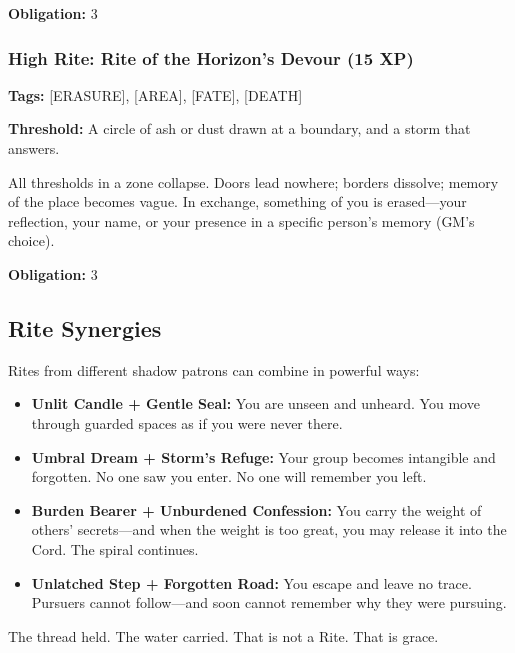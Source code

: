 \textbf{Obligation:} 3

\subsubsection{High Rite: Rite of the Horizon's Devour (15 XP)}

\textbf{Tags:} [ERASURE], [AREA], [FATE], [DEATH]

\textbf{Threshold:} A circle of ash or dust drawn at a boundary, and a storm that answers.

All thresholds in a zone collapse. Doors lead nowhere; borders dissolve; memory of the place becomes vague. In exchange, something of you is erased—your reflection, your name, or your presence in a specific person's memory (GM's choice).

\textbf{Obligation:} 3

\subsection{Rite Synergies}

Rites from different shadow patrons can combine in powerful ways:

\begin{itemize}
\item \textbf{Unlit Candle + Gentle Seal:} You are unseen and unheard. You move through guarded spaces as if you were never there.
\item \textbf{Umbral Dream + Storm's Refuge:} Your group becomes intangible and forgotten. No one saw you enter. No one will remember you left.
\item \textbf{Burden Bearer + Unburdened Confession:} You carry the weight of others' secrets—and when the weight is too great, you may release it into the Cord. The spiral continues.
\item \textbf{Unlatched Step + Forgotten Road:} You escape and leave no trace. Pursuers cannot follow—and soon cannot remember why they were pursuing.
\end{itemize}

The thread held. The water carried. That is not a Rite. That is grace.
